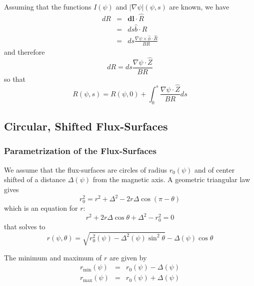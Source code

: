 \documentclass[12pt]{article}
\begin{document}
Assuming that the functions $I\left( \psi \right) $ and $\left| \nabla \psi
\right| \left( \psi ,s\right) $ are known, we have 
\begin{eqnarray}
dR &=&\mathbf{dl}\cdot \widehat{R} \\
&=&ds\widehat{b}\cdot \widehat{R} \\
&=&ds\frac{\nabla \psi \times \widehat{\phi }\cdot \widehat{R}}{BR}
\end{eqnarray}
and therefore 
\begin{equation}
dR=ds\frac{\nabla \psi \cdot \widehat{Z}}{BR}
\end{equation}
so that 
\begin{equation}
R\left( \psi ,s\right) =R\left( \psi ,0\right) +\int_{0}^{s}\frac{\nabla
\psi \cdot \widehat{Z}}{BR}ds
\end{equation}

\subsection{Circular, Shifted Flux-Surfaces}

\subsubsection{Parametrization of the Flux-Surfaces}

We assume that the flux-surfaces are circles of radius $r_{0}\left( \psi
\right) $ and of center shifted of a distance $\Delta \left( \psi \right) $
from the magnetic axis. A geometric triangular law gives 
\begin{equation}
r_{0}^{2}=r^{2}+\Delta ^{2}-2r\Delta \cos \left( \pi -\theta \right)
\end{equation}
which is an equation for $r$: 
\begin{equation}
r^{2}+2r\Delta \cos \theta +\Delta ^{2}-r_{0}^{2}=0
\end{equation}
that solves to 
\begin{equation}
r\left( \psi ,\theta \right) =\sqrt{r_{0}^{2}\left( \psi \right) -\Delta
^{2}\left( \psi \right) \sin ^{2}\theta }-\Delta \left( \psi \right) \cos
\theta
\end{equation}

The minimum and maximum of $r$ are given by 
\begin{eqnarray}
r_{\min }\left( \psi \right) &=&r_{0}\left( \psi \right) -\Delta \left( \psi
\right) \\
r_{\max }\left( \psi \right) &=&r_{0}\left( \psi \right) +\Delta \left( \psi
\right)
\end{eqnarray}
\end{document}
